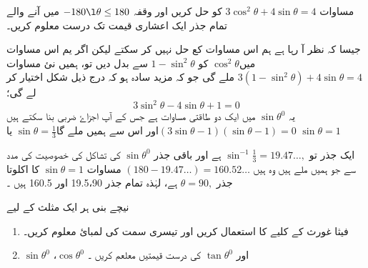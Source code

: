 مساوات \(3\cos^2\theta+4\sin\theta=4\) کو حل کریں اور وقفہ 
\(-180\l \theta \le 180\)
میں آنے والے تمام جذر ایک اعشاری قیمت تک درست معلوم کریں۔

جیسا کہ نظر آ رہا ہے ہم اس مساوات کع حل نہیں کر سکتے لیکن اگر یم اس مساوات میں\(\cos^2\theta\)  کو  \(1-\sin^2\theta\) سے بدل دیں تو، ہمیں نئ مساوات \(3(1-\sin^2\theta)+4\sin\theta=4\) ملے گی جو کہ مزید سادہ ہو کہ درج ذیل شکل اختیار کر لے گی؛
\[3\sin^2\theta-4\sin\theta+1=0\]
یہ \( \sin \theta^{0}\)  میں ایک دو طاقتی مساوات ہے جس کے  آپ اجزاۓ ضربی بنا سکتے ہیں\((3\sin\theta-1)(\sin\theta-1)=0\)اور اس سے ہمیں ملے گا\(\sin\theta=\frac{1}{3}\) یا \(\sin\theta=1\)

ایک جذر تو \(\sin^{-1}\frac{1}{3}=19.47\ldots,\) ہے اور باقی جذر \( \sin \theta^{0}\)   کی تشاکل کی خصوصیت کی مدد سے جو ہمیں ملے ہیں وہ ہیں 
\( (180-19.47\ldots)=160.52\ldots\)
مساوات \(\sin\theta=1\) کا اکلوتا جذر \(\theta=90,\) ہے، لہٰذہ تمام جذر 19.5،90 اور 160.5 ہیں ۔


نیچے بنی ہر ایک مثلث کے لیے 
\begin{enumerate}
\item  
فیثا غورث کے کلیے کا استعمال کریں اور تیسری سمت کی لمبائ معلوم کریں۔
\item
\( \sin \theta^{0}\)   ،\( \cos \theta^{0}\)   
اور \( \tan \theta^{0}\) کی درست قیمتیں معلعم کریں ۔
\end{enumerate}

